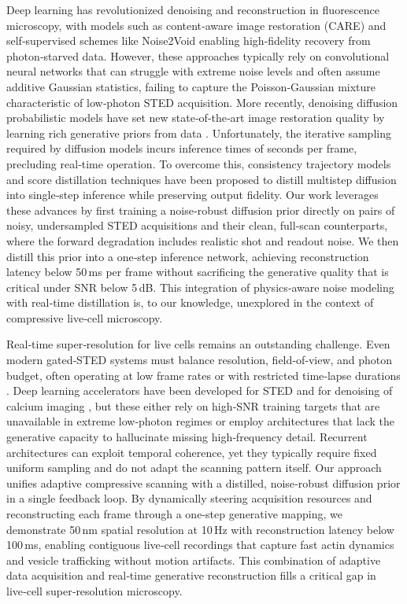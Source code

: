 \documentclass{article}
\begin{document}
Deep learning has revolutionized denoising and reconstruction in fluorescence microscopy, with models such as content‑aware image restoration (CARE) \cite{weigert2018content} and self‑supervised schemes like Noise2Void \cite{krull2019noise2void} enabling high‑fidelity recovery from photon‑starved data. However, these approaches typically rely on convolutional neural networks that can struggle with extreme noise levels and often assume additive Gaussian statistics, failing to capture the Poisson‑Gaussian mixture characteristic of low‑photon STED acquisition. More recently, denoising diffusion probabilistic models \cite{ho2020denoising,song2021scorebased} have set new state‑of‑the‑art image restoration quality by learning rich generative priors from data \cite{saharia2022palette}. Unfortunately, the iterative sampling required by diffusion models incurs inference times of seconds per frame, precluding real‑time operation. To overcome this, consistency trajectory models \cite{song2023consistency} and score distillation techniques \cite{meng2023distillation} have been proposed to distill multistep diffusion into single‑step inference while preserving output fidelity. Our work leverages these advances by first training a noise‑robust diffusion prior directly on pairs of noisy, undersampled STED acquisitions and their clean, full‑scan counterparts, where the forward degradation includes realistic shot and readout noise. We then distill this prior into a one‑step inference network, achieving reconstruction latency below 50\,ms per frame without sacrificing the generative quality that is critical under SNR below 5\,dB. This integration of physics‑aware noise modeling with real‑time distillation is, to our knowledge, unexplored in the context of compressive live‑cell microscopy.

Real‑time super‑resolution for live cells remains an outstanding challenge. Even modern gated‑STED systems must balance resolution, field‑of‑view, and photon budget, often operating at low frame rates or with restricted time‑lapse durations \cite{vicidomini2018sted}. Deep learning accelerators have been developed for STED \cite{huang2018fast} and for denoising of calcium imaging \cite{belthangady2021deepcad}, but these either rely on high‑SNR training targets that are unavailable in extreme low‑photon regimes or employ architectures that lack the generative capacity to hallucinate missing high‑frequency detail. Recurrent architectures \cite{chen2023recurrent} can exploit temporal coherence, yet they typically require fixed uniform sampling and do not adapt the scanning pattern itself. Our approach unifies adaptive compressive scanning with a distilled, noise‑robust diffusion prior in a single feedback loop. By dynamically steering acquisition resources and reconstructing each frame through a one‑step generative mapping, we demonstrate 50\,nm spatial resolution at 10\,Hz with reconstruction latency below 100\,ms, enabling contiguous live‑cell recordings that capture fast actin dynamics and vesicle trafficking without motion artifacts. This combination of adaptive data acquisition and real‑time generative reconstruction fills a critical gap in live‑cell super‑resolution microscopy.
\end{document}
